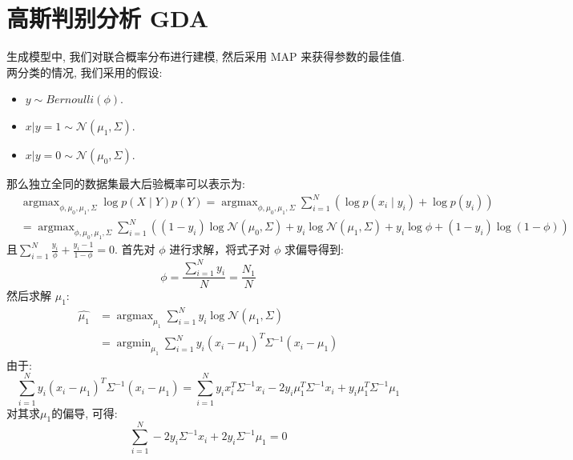 \section{高斯判别分析 GDA}
生成模型中, 我们对联合概率分布进行建模, 然后采用 MAP 来获得参数的最佳值. 两分类的情况, 我们采用的假设:
\begin{itemize}
	\item $y\sim Bernoulli(\phi)$.
	\item $x|y=1\sim\mathcal{N}(\mu_1,\Sigma)$. 
	\item $x|y=0\sim\mathcal{N}(\mu_0,\Sigma)$. 
\end{itemize}
那么独立全同的数据集最大后验概率可以表示为:
\begin{equation}
\begin{aligned}
&\operatorname{argmax}_{\phi, \mu_{0}, \mu_{1}, \Sigma} \log p(X \mid Y) p(Y)=\operatorname{argmax}_{\phi, \mu_{0}, \mu_{1}, \Sigma} \sum_{i=1}^{N}\left(\log p\left(x_{i} \mid y_{i}\right)+\log p\left(y_{i}\right)\right) \\
&=\operatorname{argmax}_{\phi, \mu_{0}, \mu_{1}, \Sigma} \sum_{i=1}^{N}\left(\left(1-y_{i}\right) \log \mathcal{N}\left(\mu_{0}, \Sigma\right)+y_{i} \log \mathcal{N}\left(\mu_{1}, \Sigma\right)+y_{i} \log \phi+\left(1-y_{i}\right) \log (1-\phi)\right)
\end{aligned}
​\end{equation}
且$\sum_{i=1}^{N} \frac{y_{i}}{\phi}+\frac{y_{i}-1}{1-\phi}=0$. 首先对 $\phi$ 进行求解，将式子对 $\phi$ 求偏导得到:
\begin{equation}
\phi=\frac{\sum_{i=1}^{N} y_{i}}{N}=\frac{N_{1}}{N}
​\end{equation}
然后求解 $\mu_1$:
\begin{equation}
\begin{aligned}
\hat{\mu_{1}} & =\operatorname{argmax}_{\mu_{1}} \sum_{i=1}^{N} y_{i} \log \mathcal{N}\left(\mu_{1}, \Sigma\right) \\
& =\operatorname{argmin}_{\mu_{1}} \sum_{i=1}^{N} y_{i}\left(x_{i}-\mu_{1}\right)^{T} \Sigma^{-1}\left(x_{i}-\mu_{1}\right)
\end{aligned}
​\end{equation}
由于:
\begin{equation}
\sum_{i=1}^{N} y_{i}\left(x_{i}-\mu_{1}\right)^{T} \Sigma^{-1}\left(x_{i}-\mu_{1}\right)=\sum_{i=1}^{N} y_{i} x_{i}^{T} \Sigma^{-1} x_{i}-2 y_{i} \mu_{1}^{T} \Sigma^{-1} x_{i}+y_{i} \mu_{1}^{T} \Sigma^{-1} \mu_{1}
​\end{equation}
对其求$\mu_1$的偏导, 可得:
\begin{equation}
\sum_{i=1}^{N}-2 y_{i} \Sigma^{-1} x_{i}+2 y_{i} \Sigma^{-1} \mu_{1}=0
​\end{equation}
